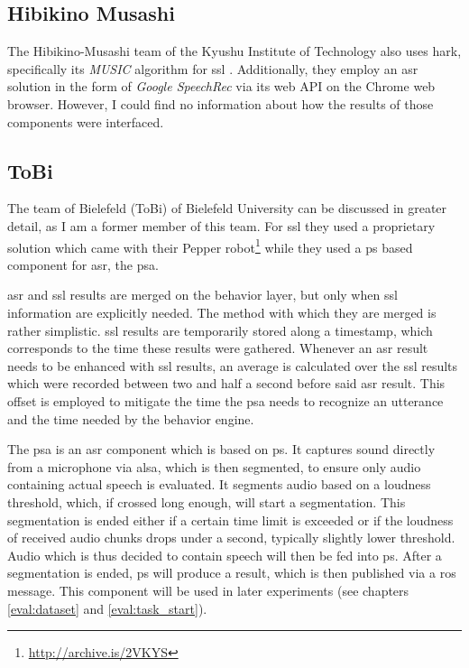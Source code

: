 \subsection{Hibikino Musashi}
The Hibikino-Musashi team of the Kyushu Institute of Technology also uses \gls{hark}, specifically its \textit{MUSIC} algorithm for \gls{ssl} \cite{hibikino}.
Additionally, they employ an \gls{asr} solution in the form of \textit{Google SpeechRec} via its web API on the Chrome web browser.
However, I could find no information about how the results of those components were interfaced.

\subsection{ToBi}
The team of Bielefeld (ToBi) of Bielefeld University \cite{tobitdp} can be discussed in greater detail, as I am a former member of this team.
For \gls{ssl} they used a proprietary solution which came with their Pepper robot\footnote{\url{http://archive.is/2VKYS}}
while they used a \gls{ps} based component for \gls{asr}, the \gls{psa}. 

\gls{asr} and \gls{ssl} results are merged on the behavior layer, but only when \gls{ssl} information are explicitly needed.
The method with which they are merged is rather simplistic.
\gls{ssl} results are temporarily stored along a timestamp, which corresponds to the time these results were gathered.
Whenever an \gls{asr} result needs to be enhanced with \gls{ssl} results, an average is calculated over the \gls{ssl} results which were recorded between two and half a second before said \gls{asr} result.
This offset is employed to mitigate the time the \gls{psa} needs to recognize an utterance and the time needed by the behavior engine. 

The \gls{psa} is an \gls{asr} component which is based on \gls{ps}. \label{related_work:psa}
It captures sound directly from a microphone via \gls{alsa}, which is then segmented, to ensure only audio containing actual speech is evaluated.
It segments audio based on a loudness threshold, which, if crossed long enough, will start a segmentation.
This segmentation is ended either if a certain time limit is exceeded or if the loudness of received audio chunks drops under a second, typically slightly lower threshold.
Audio which is thus decided to contain speech will then be fed into \gls{ps}.
After a segmentation is ended, \gls{ps} will produce a result, which is then published via a \gls{ros} message.
This component will be used in later experiments (see chapters \ref{eval:dataset} and \ref{eval:task_start}).

